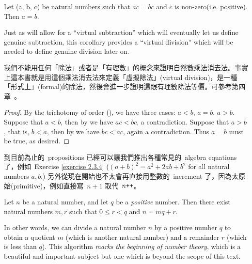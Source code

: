 \begin{corollary} \label{corollary 2.3.7}
Let (a, b, c) be natural numbers such that \(ac = bc\) and \(c\) is non-zero(i.e. positive). Then \(a = b\).
\end{corollary}

\begin{remark} \label{remark 2.3.8}
Just as  will allow for a “virtual subtraction” which will eventually let us define genuine subtraction, this corollary provides a “virtual division” which will be needed to define genuine division later on.
\end{remark}
\begin{note}
我們不能用任何「除法」或者是「有理數」的概念來證明自然數乘法消去法。事實上這本書就是用這個乘法消去法來定義「虛擬除法」(virtual division)，是一種「形式上」(formal)的除法，然後會進一步證明這跟有理數除法等價。可參考第四章\ 。
\end{note}
\begin{proof}
By the trichotomy of order (), we have three cases: \(a < b\), \(a = b\), \(a > b\). Suppose that \(a < b\), then by  we have \(ac < bc\), a contradiction. Suppose that \(a > b\), that is, \(b < a\), then by  we have \(bc < ac\), again a contradiction. Thus \(a = b\) must be true, as desired.
\end{proof}

\begin{note}
到目前為止的\ propositions 已經可以讓我們推出各種常見的\ algebra equations 了，例如\ Exercise \ref{exercise 2.3.4} (\((a + b)^2 = a^2 +2ab + b^2\) for all natural numbers \(a, b\).) 另外從現在開始也不太會再直接用整數的\ increment 了，因為太原始(primitive)，例如直接寫\ \(n + 1\) 取代\ \(n\texttt{++}\)。
\end{note}

\begin{proposition} \label{prop 2.3.9}
Let \(n\) be a natural number, and let \(q\) be a \emph{positive} number. Then there exist natural numbers \(m, r\) such that \(0 \leq r < q\) and \(n = mq + r\).
\end{proposition}

\begin{remark} \label{remark 2.3.10}
In other words, we can divide a natural number \(n\) by a positive number \(q\) to obtain a quotient \(m\) (which is another natural number) and a remainder \(r\) (which is less than \(q\)). This algorithm \emph{marks the beginning of number theory}, which is a beautiful and important subject but one which is beyond the scope of this text.
\end{remark}

